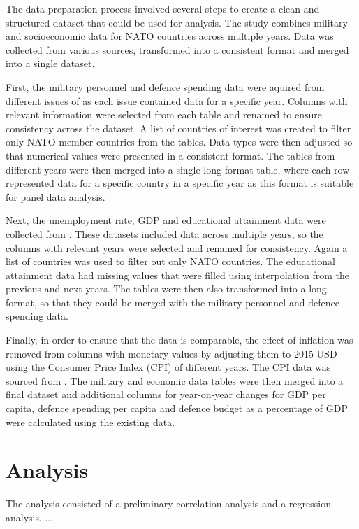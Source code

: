 The data preparation process involved several steps to create a clean and structured 
dataset that could be used for analysis. The study combines military and socioeconomic 
data for NATO countries across multiple years. Data was collected from various sources,
transformed into a consistent format and merged into a single dataset.

First, the military personnel and defence 
spending data were aquired from different issues of \textcite{noauthor_military_balance_nodate} 
as each issue contained data for a specific year. Columns with relevant information were 
selected from each table and renamed to ensure consistency across the dataset. A list of 
countries of interest was created to filter only NATO member countries from the tables.
Data types were then adjusted so that numerical values were presented in a consistent format.
The tables from different years were then merged into a single long-format table, where
each row represented data for a specific country in a specific year as this format is 
suitable for panel data analysis.

Next, the unemployment rate, GDP and educational attainment data were collected from 
\textcite{noauthor_world_bank_nodate}. These datasets included data across multiple years, 
so the columns with relevant years were selected and renamed for consistency. Again a 
list of countries was used to filter out only NATO countries. The educational attainment 
data had missing values that were filled using interpolation from the previous and next 
years. The tables were then also transformed into a long format, so that they could be 
merged with the military personnel and defence spending data.

Finally, in order to ensure that the data is comparable, the effect of inflation was removed 
from columns with monetary values by adjusting them to 2015 USD using the Consumer Price 
Index (CPI) of different years. The CPI data was sourced from \textcite{federal_reserve_bank_of_minneapolis_consumer_nodate}. 
The military and economic data tables were then merged into a final dataset and additional 
columns for year-on-year changes for GDP per capita, defence spending per capita  
and defence budget as a percentage of GDP were calculated using the existing data.

\section{Analysis}

The analysis consisted of a preliminary correlation analysis and a regression analysis. ...

